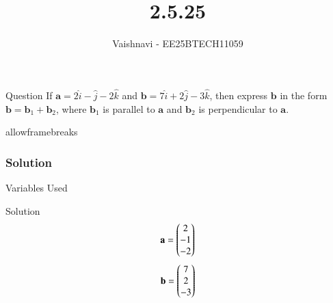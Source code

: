 \documentclass{beamer}
\title %
{2.5.25}
\author %
{Vaishnavi - EE25BTECH11059}
\begin{document}
\frame{\titlepage}
\begin{frame}{Question}
If $\mathbf{a} = 2\hat{i} - \hat{j} - 2\hat{k}$ and $\mathbf{b} = 7\hat{i} + 2\hat{j} - 3\hat{k}$, then express $\mathbf{b}$ in the form $\mathbf{b} = \mathbf{b}_1 + \mathbf{b}_2$, where $\mathbf{b}_1$ is parallel to $\mathbf{a}$ and $\mathbf{b}_2$ is perpendicular to $\mathbf{a}$.
 

\end{frame}
\begin{frame}{allowframebreaks}
\frametitle{Solution}
\begin{table}[H]    
  \centering
  
  \caption{Variables Used}
  \label{tab:1.10.25}
\end{table}

\end{frame}


\begin{frame}{Solution}
\begin{align}
                                     \mathbf{a}= \begin{pmatrix}
                                             2
                                              \\
                                              -1
                                               \\
                                               -2
                                              \end{pmatrix}
\end{align}
\begin{align}
                                     \mathbf{b}= \begin{pmatrix}
                                             7
                                              \\
                                              2
                                               \\
                                               -3
                                              \end{pmatrix}
\end{align}

\end{frame}
\end{document}

